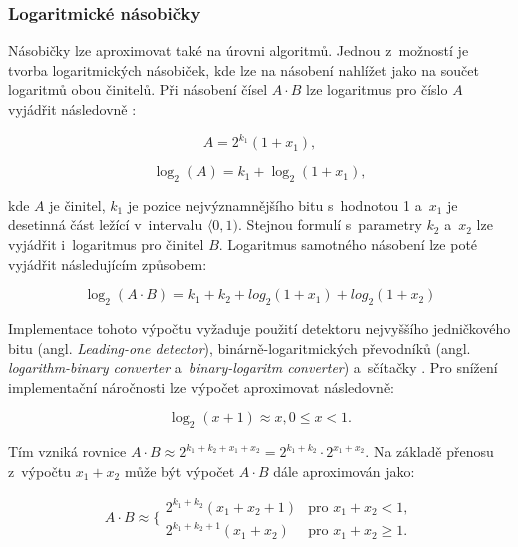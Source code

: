 \subsubsection{Logaritmické násobičky}
Násobičky lze aproximovat také na úrovni algoritmů. Jednou z~možností je tvorba logaritmických násobiček, kde lze na násobení nahlížet jako na součet logaritmů obou činitelů. Při násobení čísel $A \cdot B$ lze logaritmus pro číslo $A$ vyjádřit následovně \cite{mitchell_log}:

\begin{equation}
    A = 2^{k_1}(1+x_1),
\end{equation}

\begin{equation}
    \log_2(A) = k_1 + \log_2(1+x_1),
\end{equation}

kde $A$ je činitel, $k_1$ je pozice nejvýznamnějšího bitu s~hodnotou 1 a~$x_1$ je desetinná část ležící v~intervalu $\langle0,1)$. Stejnou formulí s~parametry $k_2$ a~$x_2$ lze vyjádřit i~logaritmus pro činitel $B$. Logaritmus samotného násobení lze poté vyjádřit následujícím způsobem:

\begin{equation}
    \log_2(A \cdot B) = k_1 + k_2 + log_2(1+x_1) + log_2(1 + x_2)
\end{equation}

Implementace tohoto výpočtu vyžaduje použití detektoru nejvyššího jedničkového bitu (angl. \textit{Leading-one detector}), binárně-logaritmických převodníků (angl. \textit{logarithm-binary converter} a~\textit{binary-logaritm converter}) a~sčítačky \cite{approx_mult_survey}. Pro snížení implementační náročnosti lze výpočet aproximovat následovně:

\begin{equation}
    \log_2(x+1) \approx x, 0 \leq x < 1.
\end{equation}

Tím vzniká rovnice $A \cdot B \approx 2^{k_1+k_2+x_1+x_2} = 2^{k_1+k_2} \cdot 2^{x_1+x_2}$. Na základě přenosu z~výpočtu $x_1 + x_2$ může být výpočet $A \cdot B$ dále aproximován jako:

\begin{equation}
    A \cdot B \approx \Bigg\{ 
    \begin{array}{ll}
        2^{k_1+k_2}(x_1+x_2+1) & \text{pro } x_1 + x_2 < 1, \\
        2^{k_1+k_2+1}(x_1+x_2) & \text{pro } x_1 + x_2 \geq 1.
    \end{array}
\end{equation}

